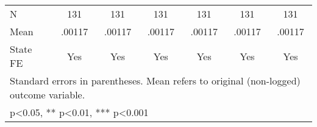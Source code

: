 {\begin{tabular}{l*{6}{c}}
\midrule
N                   &         131         &         131         &         131         &         131         &         131         &         131         \\
Mean                &      .00117         &      .00117         &      .00117         &      .00117         &      .00117         &      .00117         \\
State FE            &         Yes         &         Yes         &         Yes         &         Yes         &         Yes         &         Yes         \\
\bottomrule
\multicolumn{7}{l}{\footnotesize Standard errors in parentheses. Mean refers to original (non-logged) outcome variable.}\\
\multicolumn{7}{l}{\footnotesize * p<0.05, ** p<0.01, *** p<0.001}\\
\end{tabular}
}
